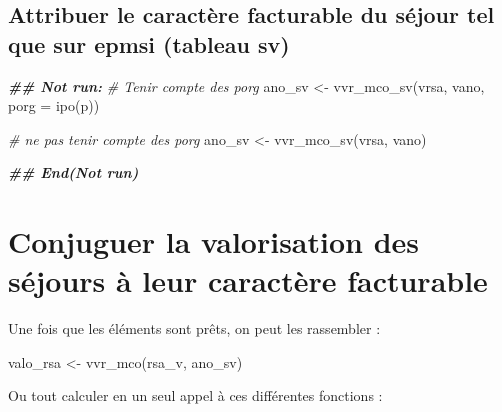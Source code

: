 \documentclass[
]{book}
\newenvironment{Shaded}{\begin{snugshade}}{\end{snugshade}}
\newcommand{\AttributeTok}[1]{\textcolor[rgb]{0.77,0.63,0.00}{#1}}
\newcommand{\CommentTok}[1]{\textcolor[rgb]{0.56,0.35,0.01}{\textit{#1}}}
\newcommand{\DocumentationTok}[1]{\textcolor[rgb]{0.56,0.35,0.01}{\textbf{\textit{#1}}}}
\newcommand{\FunctionTok}[1]{\textcolor[rgb]{0.00,0.00,0.00}{#1}}
\newcommand{\NormalTok}[1]{#1}
\newcommand{\OtherTok}[1]{\textcolor[rgb]{0.56,0.35,0.01}{#1}}
\begin{document}
\hypertarget{attribuer-le-caractuxe8re-facturable-du-suxe9jour-tel-que-sur-epmsi-tableau-sv}{%
\subsection{Attribuer le caractère facturable du séjour tel que sur epmsi (tableau sv)}\label{attribuer-le-caractuxe8re-facturable-du-suxe9jour-tel-que-sur-epmsi-tableau-sv}}

\begin{Shaded}
\begin{Highlighting}[]
\DocumentationTok{\#\# Not run: }
\CommentTok{\# Tenir compte des porg}
\NormalTok{ano\_sv }\OtherTok{\textless{}{-}} \FunctionTok{vvr\_mco\_sv}\NormalTok{(vrsa, vano, }\AttributeTok{porg =} \FunctionTok{ipo}\NormalTok{(p))}

\CommentTok{\# ne pas tenir compte des porg}
\NormalTok{ano\_sv }\OtherTok{\textless{}{-}} \FunctionTok{vvr\_mco\_sv}\NormalTok{(vrsa, vano)}

\DocumentationTok{\#\# End(Not run)}
\end{Highlighting}
\end{Shaded}

\hypertarget{conjuguer-la-valorisation-des-suxe9jours-uxe0-leur-caractuxe8re-facturable}{%
\section{Conjuguer la valorisation des séjours à leur caractère facturable}\label{conjuguer-la-valorisation-des-suxe9jours-uxe0-leur-caractuxe8re-facturable}}

Une fois que les éléments sont prêts, on peut les rassembler :

\begin{Shaded}
\begin{Highlighting}[]
\NormalTok{valo\_rsa }\OtherTok{\textless{}{-}} \FunctionTok{vvr\_mco}\NormalTok{(rsa\_v, ano\_sv)}
\end{Highlighting}
\end{Shaded}

Ou tout calculer en un seul appel à ces différentes fonctions :
\end{document}
